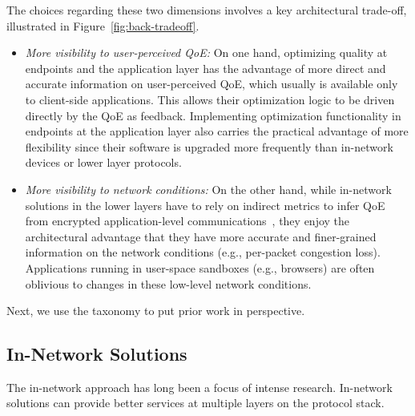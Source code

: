 The choices regarding these two dimensions involves a key architectural 
trade-off, illustrated in Figure~\ref{fig:back-tradeoff}.
\begin{itemize}

\item {\em More visibility to user-perceived QoE:} 
On one hand, optimizing quality at endpoints and the application layer has 
the advantage of more direct and accurate information on user-perceived 
QoE, which usually is available only to client-side applications.
This allows their optimization logic to be driven directly by the QoE as 
feedback. Implementing optimization functionality in endpoints at the 
application layer also carries the practical advantage of more flexibility since 
their software is upgraded more frequently than in-network devices or 
lower layer protocols.

\item {\em More visibility to network conditions:}
On the other hand, while in-network solutions in the lower layers have to rely 
on indirect metrics to infer QoE from encrypted application-level 
communications~\cite{mobicom2014-qos,
aggarwal2014prometheus,imc2012-firstbyte}, 
they enjoy the architectural advantage that they have more accurate and 
finer-grained information on the network conditions (e.g., per-packet congestion 
loss).
Applications running in user-space sandboxes (e.g., browsers) are often 
oblivious to changes in these low-level network conditions.

\end{itemize}




Next, we use the taxonomy to put prior work in perspective.

\subsection{In-Network Solutions}
The in-network approach has long been a focus of intense research. 
In-network solutions can provide better services at multiple layers on
the protocol stack.

